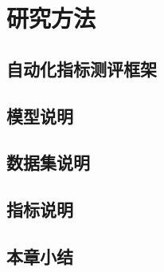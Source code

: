 
\chapter{研究方法}\label{ch:研究方法}

\section{自动化指标测评框架}

\section{模型说明}

\section{数据集说明}

\section{指标说明}

\section{本章小结}\label{sec:本章小结2}
